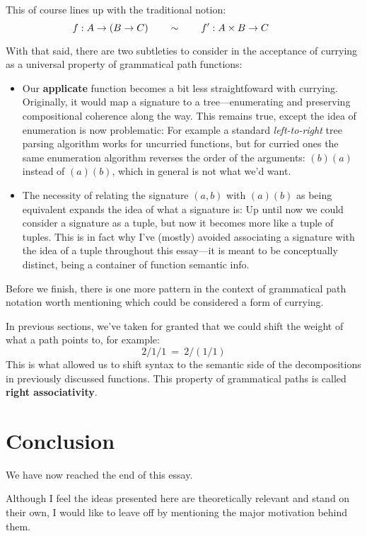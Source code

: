 \documentclass[twoside]{article}
\newcommand{\strong}[1]{{\bfseries #1}}
\begin{document}
This of course lines up with the traditional notion:
$$ \hspace{-0.95cm} f : A \to (B \to C) \qquad \sim \qquad f' : A \times B \to C $$

With that said, there are two subtleties to consider in the acceptance of currying as a universal property
of grammatical path functions:

\begin{itemize}
\item Our \strong{applicate} function becomes a bit less straightfoward with currying. Originally, it would map
      a signature to a tree---enumerating and preserving compositional coherence along the way. This remains true,
      except the idea of enumeration is now problematic: For example a standard \emph{left-to-right} tree parsing
      algorithm works for uncurried functions, but for curried ones the same enumeration algorithm reverses
      the order of the arguments: $ (b)(a) $ instead of $ (a)(b) $, which in general is not what we'd want.
\item The necessity of relating the signature $ (a, b) $ with $ (a)(b) $ as being equivalent expands the idea
      of what a signature is: Up until now we could consider a signature as a tuple, but now it becomes more like
      a tuple of tuples. This is in fact why I've (mostly) avoided associating a signature with the idea of a tuple
      throughout this essay---it is meant to be conceptually distinct, being a container of function semantic info.
\end{itemize}

Before we finish, there is one more pattern in the context of grammatical path notation worth mentioning
which could be considered a form of currying.

In previous sections, we've taken for granted that we could shift the weight of what a path points to,
for example:
$$ 2/1/1\ =\ 2/(1/1) $$
This is what allowed us to shift syntax to the semantic side of the decompositions in previously
discussed functions. This property of grammatical paths is called \strong{right associativity}.

\section*{Conclusion}

We have now reached the end of this essay.

Although I feel the ideas presented here are theoretically relevant and stand on their own, I would like
to leave off by mentioning the major motivation behind them.
\end{document}
